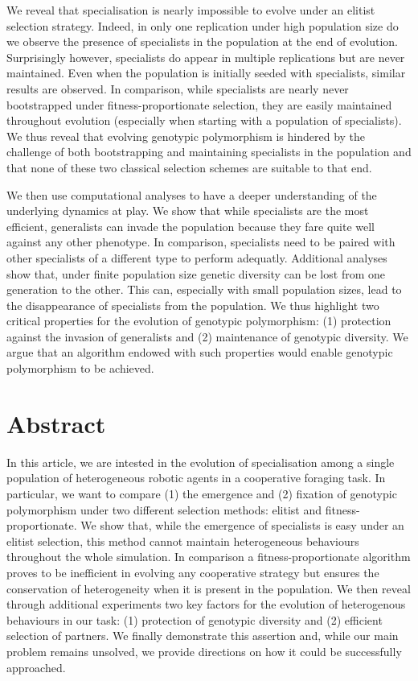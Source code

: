 We reveal that specialisation is nearly impossible to evolve under an elitist selection strategy. Indeed, in only one replication under high population size do we observe the presence of specialists in the population at the end of evolution. Surprisingly however, specialists do appear in multiple replications but are never maintained. Even when the population is initially seeded with specialists, similar results are observed. In comparison, while specialists are nearly never bootstrapped under fitness-proportionate selection, they are easily maintained throughout evolution (especially when starting with a population of specialists). We thus reveal that evolving genotypic polymorphism is hindered by the challenge of both bootstrapping and maintaining specialists in the population and that none of these two classical selection schemes are suitable to that end.

We then use computational analyses to have a deeper understanding of the underlying dynamics at play. We show that while specialists are the most efficient, generalists can invade the population because they fare quite well against any other phenotype. In comparison, specialists need to be paired with other specialists of a different type to perform adequatly. Additional analyses show that, under finite population size genetic diversity can be lost from one generation to the other. This can, especially with small population sizes, lead to the disappearance of specialists from the population. We thus highlight two critical properties for the evolution of genotypic polymorphism: (1) protection against the invasion of generalists and (2) maintenance of genotypic diversity. We argue that an algorithm endowed with such properties would enable genotypic polymorphism to be achieved.

\clearpage



\section{Abstract}
  In this article, we are intested in the evolution of specialisation among a single population of heterogeneous robotic agents in a cooperative foraging task. In particular, we want to compare (1) the emergence and (2) fixation of genotypic polymorphism under two different selection methods: elitist and fitness-proportionate. We show that, while the emergence of specialists is easy under an elitist selection, this method cannot maintain heterogeneous behaviours throughout the whole simulation. In comparison a fitness-proportionate algorithm proves to be inefficient in evolving any cooperative strategy but ensures the conservation of heterogeneity when it is present in the population. We then reveal through additional experiments two key factors for the evolution of heterogenous behaviours in our task: (1) protection of genotypic diversity and (2) efficient selection of partners. We finally demonstrate this assertion and, while our main problem remains unsolved, we provide directions on how it could be successfully approached.


